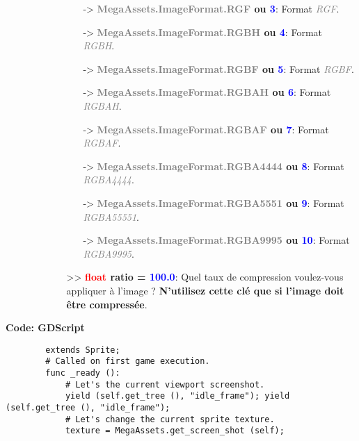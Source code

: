 \documentclass[a4paper, 11pt]{article}
\begin{document}
\begin{description}
\begin{itemize}
\begin{itemize}
\begin{itemize}
					\item [-> \textbf{\textcolor{gray}{MegaAssets.ImageFormat.RGF} ou \textcolor{blue}
					{3}}:] Format \textit{\textcolor{gray}{RGF}}.
					\item [-> \textbf{\textcolor{gray}{MegaAssets.ImageFormat.RGBH} ou \textcolor{blue}
					{4}}:] Format \textit{\textcolor{gray}{RGBH}}.
					\item [-> \textbf{\textcolor{gray}{MegaAssets.ImageFormat.RGBF} ou \textcolor{blue}
					{5}}:] Format \textit{\textcolor{gray}{RGBF}}.
					\item [-> \textbf{\textcolor{gray}{MegaAssets.ImageFormat.RGBAH} ou \textcolor{blue}
					{6}}:] Format \textit{\textcolor{gray}{RGBAH}}.
					\item [-> \textbf{\textcolor{gray}{MegaAssets.ImageFormat.RGBAF} ou \textcolor{blue}
					{7}}:] Format \textit{\textcolor{gray}{RGBAF}}.
					\item [-> \textbf{\textcolor{gray}{MegaAssets.ImageFormat.RGBA4444} ou \textcolor{blue}
					{8}}:] Format \textit{\textcolor{gray}{RGBA4444}}.
					\item [-> \textbf{\textcolor{gray}{MegaAssets.ImageFormat.RGBA5551} ou \textcolor{blue}
					{9}}:] Format \textit{\textcolor{gray}{RGBA55551}}.
					\item [-> \textbf{\textcolor{gray}{MegaAssets.ImageFormat.RGBA9995} ou \textcolor{blue}
					{10}}:] Format \textit{\textcolor{gray}{RGBA9995}}.\\
				\end{itemize}
				\item[>> \textbf{\textcolor{red}{float} ratio = \textcolor{blue}{100.0}}:] Quel taux de
				compression voulez-vous appliquer à l'image ? \textbf{N'utilisez cette clé que si l'image
				doit être compressée}.\\
			\end{itemize}
		\end{itemize}
	\end{description}
	\textbf{Code: GDScript}
	\begin{lstlisting}
		extends Sprite;
		# Called on first game execution.
		func _ready ():
			# Let's the current viewport screenshot.
			yield (self.get_tree (), "idle_frame"); yield (self.get_tree (), "idle_frame");
			# Let's change the current sprite texture.
			texture = MegaAssets.get_screen_shot (self);
	\end{lstlisting}
\end{document}

